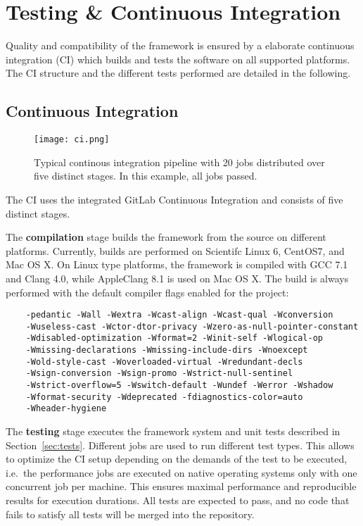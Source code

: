 \section{Testing \& Continuous Integration}
\label{sec:testing}

Quality and compatibility of the \apsq framework is ensured by a elaborate continuous integration (CI) which builds and tests the software on all supported platforms.
The CI structure and the different tests performed are detailed in the following.

\subsection{Continuous Integration}
\label{sec:ci}

\begin{figure}[btp]
  \centering
  \texttt{[image: ci.png]}
  \caption{Typical \apsq continous integration pipeline with 20 jobs distributed over five distinct stages. In this example, all jobs passed.}
  \label{fig:ci}
\end{figure}

The \apsq CI uses the integrated GitLab Continuous Integration and consists of five distinct stages.

The \textbf{compilation} stage builds the framework from the source on different platforms.
Currently, builds are performed on Scientifc Linux 6, CentOS7, and Mac OS X.
On Linux type platforms, the framework is compiled with GCC 7.1 and Clang 4.0, while AppleClang 8.1 is used on Mac OS X.
The build is always performed with the default compiler flags enabled for the project:
\begin{verbatim}
    -pedantic -Wall -Wextra -Wcast-align -Wcast-qual -Wconversion
    -Wuseless-cast -Wctor-dtor-privacy -Wzero-as-null-pointer-constant
    -Wdisabled-optimization -Wformat=2 -Winit-self -Wlogical-op
    -Wmissing-declarations -Wmissing-include-dirs -Wnoexcept
    -Wold-style-cast -Woverloaded-virtual -Wredundant-decls
    -Wsign-conversion -Wsign-promo -Wstrict-null-sentinel
    -Wstrict-overflow=5 -Wswitch-default -Wundef -Werror -Wshadow
    -Wformat-security -Wdeprecated -fdiagnostics-color=auto
    -Wheader-hygiene
\end{verbatim}

The \textbf{testing} stage executes the framework system and unit tests described in Section~\ref{sec:tests}.
Different jobs are used to run different test types.
This allows to optimize the CI setup depending on the demands of the test to be executed, i.e.\ the performance jobs are executed on native operating systems only with one concurrent job per machine.
This ensures maximal performance and reproducible results for execution durations.
All tests are expected to pass, and no code that fails to satisfy all tests will be merged into the repository.

